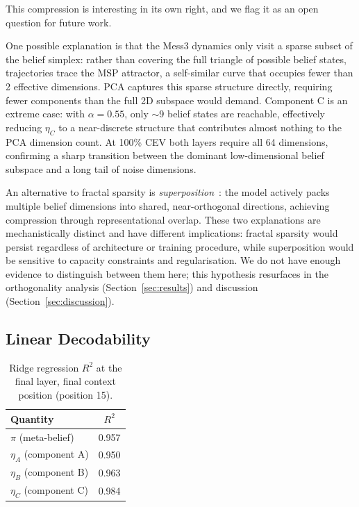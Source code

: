 \documentclass{article}
\begin{document}
This compression is interesting in its own right, and we flag it as an open question for future work.

One possible explanation is that the Mess3 dynamics only visit a sparse subset of
the belief simplex: rather than covering the full triangle of possible belief states,
trajectories trace the MSP attractor, a self-similar curve that occupies fewer than
2 effective dimensions.
PCA captures this sparse structure directly, requiring fewer components than
the full 2D subspace would demand.
Component C is an extreme case: with $\alpha=0.55$, only $\sim$9 belief states are
reachable, effectively reducing $\eta_C$ to a near-discrete structure that
contributes almost nothing to the PCA dimension count.
At 100\% CEV both layers require all 64 dimensions,
confirming a sharp transition between the dominant low-dimensional belief
subspace and a long tail of noise dimensions.

An alternative to fractal sparsity is \emph{superposition}~\cite{elhage2022superposition}: the model actively packs multiple belief dimensions into shared, near-orthogonal directions, achieving compression through representational overlap.
These two explanations are mechanistically distinct and have different implications: fractal sparsity would persist regardless of architecture or training procedure, while superposition would be sensitive to capacity constraints and regularisation.
We do not have enough evidence to distinguish between them here; this hypothesis resurfaces in the orthogonality analysis (Section~\ref{sec:results}) and discussion (Section~\ref{sec:discussion}).

\subsection{Linear Decodability}

\begin{table}[h]
\centering
\begin{tabular}{lc}
\toprule
Quantity & $R^2$ \\
\midrule
$\pi$ (meta-belief)   & 0.957 \\
$\eta_A$ (component A) & 0.950 \\
$\eta_B$ (component B) & 0.963 \\
$\eta_C$ (component C) & 0.984 \\
\bottomrule
\end{tabular}
\caption{Ridge regression $R^2$ at the final layer, final context position
(position 15).}
\label{tab:r2}
\end{table}
\end{document}
